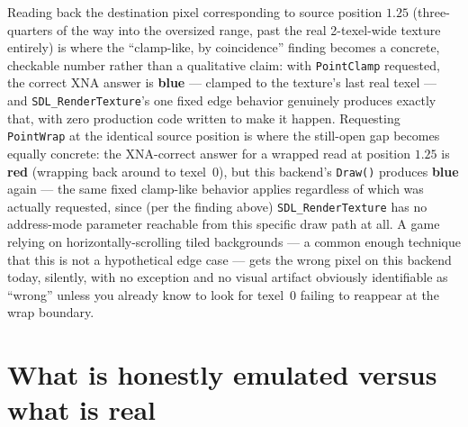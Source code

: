Reading back the destination pixel corresponding to source position $1.25$ (three-quarters of
the way into the oversized range, past the real 2-texel-wide texture entirely) is where the
``clamp-like, by coincidence'' finding becomes a concrete, checkable number rather than a
qualitative claim: with \texttt{PointClamp} requested, the correct XNA answer is
\textbf{blue} --- clamped to the texture's last real texel --- and \texttt{SDL\_RenderTexture}'s
one fixed edge behavior genuinely produces exactly that, with zero production code written to
make it happen. Requesting \texttt{PointWrap} at the identical source position is where the
still-open gap becomes equally concrete: the XNA-correct answer for a wrapped read at position
$1.25$ is \textbf{red} (wrapping back around to texel~0), but this backend's \texttt{Draw()}
produces \textbf{blue} again --- the same fixed clamp-like behavior applies regardless of which
 was actually requested, since (per the finding above)
\texttt{SDL\_RenderTexture} has no address-mode parameter reachable from this specific draw
path at all. A game relying on horizontally-scrolling tiled backgrounds --- a common enough
technique that this is not a hypothetical edge case --- gets the wrong pixel on this backend
today, silently, with no exception and no visual artifact obviously identifiable as ``wrong''
unless you already know to look for texel~0 failing to reappear at the wrap boundary.

\section{What is honestly emulated versus what is real}

